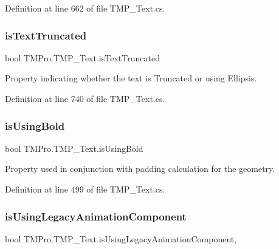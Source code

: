 Definition at line 662 of file T\+M\+P\+\_\+\+Text.\+cs.

\mbox{\label{class_t_m_pro_1_1_t_m_p___text_a421968a0cfbeaa535821900d0ee1f203}} 
\subsubsection{\texorpdfstring{isTextTruncated}{isTextTruncated}}
{\footnotesize\ttfamily bool T\+M\+Pro.\+T\+M\+P\+\_\+\+Text.\+is\+Text\+Truncated\hspace{0.3cm}{\ttfamily [get]}}



Property indicating whether the text is Truncated or using Ellipsis. 



Definition at line 740 of file T\+M\+P\+\_\+\+Text.\+cs.

\mbox{\label{class_t_m_pro_1_1_t_m_p___text_a2ad3845a02f7fd35f5b9bd7a34f5bd52}} 
\subsubsection{\texorpdfstring{isUsingBold}{isUsingBold}}
{\footnotesize\ttfamily bool T\+M\+Pro.\+T\+M\+P\+\_\+\+Text.\+is\+Using\+Bold\hspace{0.3cm}{\ttfamily [get]}}



Property used in conjunction with padding calculation for the geometry. 



Definition at line 499 of file T\+M\+P\+\_\+\+Text.\+cs.

\mbox{\label{class_t_m_pro_1_1_t_m_p___text_a58d10df90c9f5cca965aeb431ad599c4}} 
\subsubsection{\texorpdfstring{isUsingLegacyAnimationComponent}{isUsingLegacyAnimationComponent}}
{\footnotesize\ttfamily bool T\+M\+Pro.\+T\+M\+P\+\_\+\+Text.\+is\+Using\+Legacy\+Animation\+Component\hspace{0.3cm}{\ttfamily [get]}, {\ttfamily [set]}}




